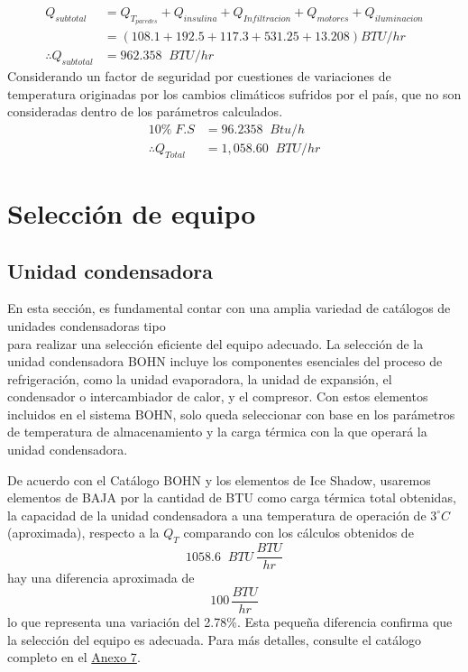  	 \begin{equation}
 	 	\begin{aligned}
 	 		Q_{subtotal} &=Q_{T_{paredes}}+Q_{insulina}+Q_{Infiltracion}+ Q_{motores}+ Q_{iluminacion} \\
 	 		&= (108.1+192.5+ 117.3 + 531.25+13.208)BTU/hr\\
 	 		 \therefore Q_{subtotal} &= 962.358\;\; BTU/hr
 	 	\end{aligned}
 	 \end{equation}
 	Considerando un factor de seguridad por cuestiones de variaciones de temperatura originadas
 	por los cambios climáticos sufridos por el país, que no son consideradas dentro de los
 	parámetros calculados.
 	 \begin{equation}
 		\begin{aligned}
 			10\% \; F.S &=96.2358 \;\;Btu/h\\
 			\therefore Q_{Total} &= 1,058.60\;\; BTU/hr
 		\end{aligned}
 	\end{equation}
 	
 \section{Selección de equipo}	

 
 \subsection{Unidad condensadora}
 
 En esta sección, es fundamental contar con una amplia variedad de catálogos de unidades condensadoras tipo \\
  para realizar una selección eficiente del equipo adecuado. La selección de la unidad condensadora BOHN incluye los componentes esenciales del proceso de refrigeración, como la unidad evaporadora, la unidad de expansión, el condensador o intercambiador de calor, y el compresor. Con estos elementos incluidos en el sistema BOHN, solo queda seleccionar con base en los parámetros de temperatura de almacenamiento y la carga térmica con la que operará la unidad condensadora.
 
 De acuerdo con el Catálogo BOHN y los elementos de Ice Shadow, usaremos elementos de BAJA por la cantidad de BTU como carga térmica total obtenidas, la capacidad de la unidad condensadora a una temperatura de operación de $3^\circ C$ (aproximada), respecto a la $Q_T$ comparando con los cálculos obtenidos de 
 \[
	1058.6\;\; BTU \, \frac{BTU}{hr}
 \]
 hay una diferencia aproximada de 
 \[
 100\, \frac{BTU}{hr}
 \]
 lo que representa una variación del 2.78\%. Esta pequeña diferencia confirma que la selección del equipo es adecuada. Para más detalles, consulte el catálogo completo en el \hyperref[fig:axo-manual-thermo-king]{Anexo 7}.
 
